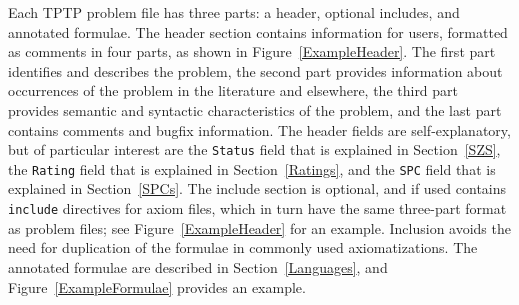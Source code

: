\documentclass[runningheads]{llncs}
\begin{document}
Each TPTP problem file has three parts: a header, optional includes, and annotated formulae.
The header section contains information for users, formatted as comments in four parts, as shown
in Figure~\ref{ExampleHeader}.
The first part identifies and describes the problem,
the second part provides information about occurrences of the problem
in the literature and elsewhere,
the third part provides semantic and syntactic characteristics of the problem, and
the last part contains comments and bugfix information.
The header fields are self-explanatory, but of particular interest are the {\tt Status} field 
that is explained in Section~\ref{SZS}, the {\tt Rating} field that is explained in 
Section~\ref{Ratings}, and the {\tt SPC} field that is explained in Section~\ref{SPCs}.
The include section is optional, and if used contains {\tt include} directives for axiom files,
which in turn have the same three-part format as problem files; see Figure~\ref{ExampleHeader}
for an example.
Inclusion avoids the need for duplication of the formulae in commonly used axiomatizations.
The annotated formulae are described in Section~\ref{Languages}, and Figure~\ref{ExampleFormulae} 
provides an example.
\end{document}
